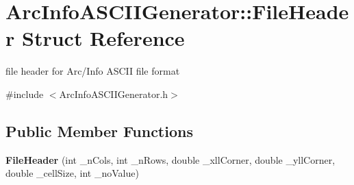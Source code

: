 \hypertarget{structArcInfoASCIIGenerator_1_1FileHeader}{\section{\-Arc\-Info\-A\-S\-C\-I\-I\-Generator\-:\-:\-File\-Header \-Struct \-Reference}
\label{structArcInfoASCIIGenerator_1_1FileHeader}
}


file header for \-Arc/\-Info \-A\-S\-C\-I\-I file format  




{\ttfamily \#include $<$\-Arc\-Info\-A\-S\-C\-I\-I\-Generator.\-h$>$}

\subsection*{\-Public \-Member \-Functions}
\begin{DoxyCompactItemize}
\item 
\hypertarget{structArcInfoASCIIGenerator_1_1FileHeader_aee1a0a9583333dc3f6e10d3a297386ff}{{\bfseries \-File\-Header} (int \-\_\-n\-Cols, int \-\_\-n\-Rows, double \-\_\-xll\-Corner, double \-\_\-yll\-Corner, double \-\_\-cell\-Size, int \-\_\-no\-Value)}\label{structArcInfoASCIIGenerator_1_1FileHeader_aee1a0a9583333dc3f6e10d3a297386ff}

\end{DoxyCompactItemize}
